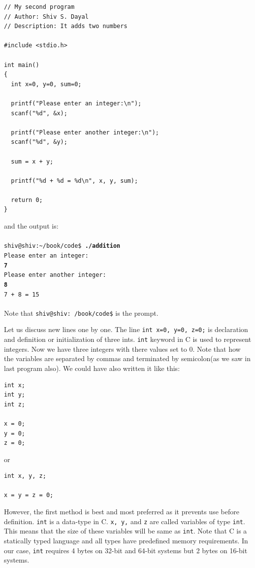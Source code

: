 \begin{Verbatim}[frame=single]
// My second program
// Author: Shiv S. Dayal
// Description: It adds two numbers

#include <stdio.h>

int main()
{
  int x=0, y=0, sum=0;

  printf("Please enter an integer:\n");
  scanf("%d", &x);

  printf("Please enter another integer:\n");
  scanf("%d", &y);

  sum = x + y;

  printf("%d + %d = %d\n", x, y, sum);

  return 0;
}
\end{Verbatim}
and the output is:
\\\\\texttt{shiv@shiv:\textasciitilde/book/code\$ \textbf{./addition}\\
Please enter an integer:\\
\textbf{7}\\
Please enter another integer:\\
\textbf{8}\\
7 + 8 = 15}\\\\
Note that \texttt{shiv@shiv:~/book/code\$} is the prompt.

Let us discuss new lines one by one. The line \texttt{int x=0, y=0, z=0;} is
declaration and definition or initialization of three ints. \texttt{int}
keyword in C is used to represent integers. Now we have three integers with
there values set to 0. Note that how the variables are separated by commas and
terminated by semicolon(as we saw in last program also). We could have also
written it like this:

\begin{Verbatim}[frame=single]
int x;
int y;
int z;

x = 0;
y = 0;
z = 0;
\end{Verbatim}

or

\begin{Verbatim}[frame=single]
int x, y, z;

x = y = z = 0;
\end{Verbatim}

However, the first method is best and most preferred as it prevents use before
definition. \texttt{int} is a data-type in C. \texttt{x, y,} and \texttt{z} are
called variables of type \texttt{int}. This means that the size of these
variables will be same as \texttt{int}. Note that 
C is a statically typed language and all types have predefined memory
requirements. In our case, \texttt{int} requires 4 bytes on 32-bit and 64-bit
systems but 2 bytes on 16-bit systems.

